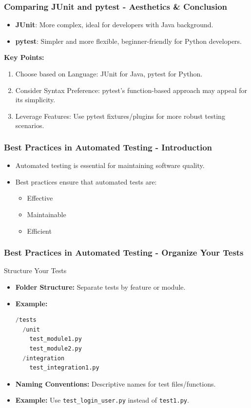 \documentclass{beamer}
\begin{document}
\begin{frame}[fragile]
    \frametitle{Comparing JUnit and pytest - Aesthetics & Conclusion}
    \begin{itemize}
        \item \textbf{JUnit}: More complex, ideal for developers with Java background.
        \item \textbf{pytest}: Simpler and more flexible, beginner-friendly for Python developers.
    \end{itemize}
    
    \textbf{Key Points:}
    \begin{enumerate}
        \item Choose based on Language: JUnit for Java, pytest for Python.
        \item Consider Syntax Preference: pytest's function-based approach may appeal for its simplicity.
        \item Leverage Features: Use pytest fixtures/plugins for more robust testing scenarios.
    \end{enumerate}
\end{frame}

\begin{frame}[fragile]
    \frametitle{Best Practices in Automated Testing - Introduction}
    \begin{itemize}
        \item Automated testing is essential for maintaining software quality.
        \item Best practices ensure that automated tests are:
        \begin{itemize}
            \item Effective
            \item Maintainable
            \item Efficient
        \end{itemize}
    \end{itemize}
\end{frame}

\begin{frame}[fragile]
    \frametitle{Best Practices in Automated Testing - Organize Your Tests}
    \begin{block}{Structure Your Tests}
        \begin{itemize}
            \item \textbf{Folder Structure:} Separate tests by feature or module.
            \item \textbf{Example:}
            \begin{lstlisting}[language=Python]
/tests
  /unit
    test_module1.py
    test_module2.py
  /integration
    test_integration1.py
            \end{lstlisting}
            \item \textbf{Naming Conventions:} Descriptive names for test files/functions.
            \item \textbf{Example:} Use \texttt{test\_login\_user.py} instead of \texttt{test1.py}.
        \end{itemize}
    \end{block}
\end{frame}
\end{document}
